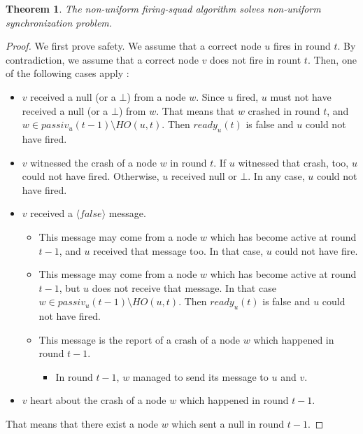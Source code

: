 \documentclass{article}
\newtheorem{theorem}{Theorem}
\begin{document}
\begin{theorem}
	The non-uniform firing-squad algorithm solves non-uniform synchronization problem.
\end{theorem}
\begin{proof}
	We first prove safety. We assume that a correct node $u$ fires in round $t$.
	By contradiction, we assume that a correct node $v$ does not fire in rount $t$.
	Then, one of the following cases apply :
	\begin{itemize}
		\item $v$ received a null (or a $\bot$) from a node $w$.
			Since $u$ fired, $u$ must not have received a null (or a $\bot$) from $w$. That means that $w$ crashed in round $t$, and $w \in passiv_u(t-1) \setminus HO(u, t)$.
			Then $ready_u(t)$ is false and $u$ could not have fired.
		\item $v$ witnessed the crash of a node $w$ in round $t$.
			If $u$ witnessed that crash, too, $u$ could not have fired.
			Otherwise, $u$ received null or $\bot$.
			In any case, $u$ could not have fired.
		\item $v$ received a $\langle false \rangle$ message.
		\begin{itemize}
			\item This message may come from a node $w$ which has become active at round $t-1$, and $u$ received that message too.
				In that case, $u$ could not have fire.
			\item This message may come from a node $w$ which has become active at round $t-1$, but $u$ does not receive that message.
				In that case $w \in passiv_u(t-1) \setminus HO(u,t)$.
				Then $ready_u(t)$ is false and $u$ could not have fired.
			\item This message is the report of a crash of a node $w$ which happened in round $t-1$.
			\begin{itemize}
				\item In round $t-1$, $w$ managed to send its message to $u$ and $v$.

			\end{itemize}
		\end{itemize}
		\item $v$ heart about the crash of a node $w$ which happened in round $t-1$.
	\end{itemize}
	That means that there exist a node $w$ which sent a null in round $t-1$.

\end{proof}
\end{document}
